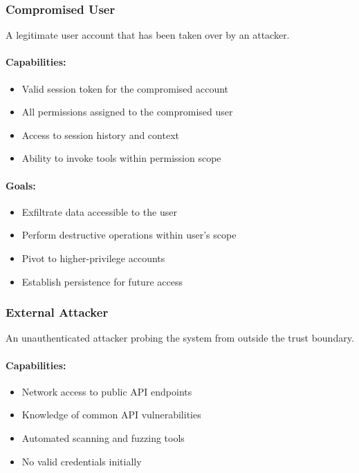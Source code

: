\subsubsection{Compromised User}

A legitimate user account that has been taken over by an attacker.

\paragraph{Capabilities:}
\begin{itemize}
    \item Valid session token for the compromised account
    \item All permissions assigned to the compromised user
    \item Access to session history and context
    \item Ability to invoke tools within permission scope
\end{itemize}

\paragraph{Goals:}
\begin{itemize}
    \item Exfiltrate data accessible to the user
    \item Perform destructive operations within user's scope
    \item Pivot to higher-privilege accounts
    \item Establish persistence for future access
\end{itemize}

\subsubsection{External Attacker}

An unauthenticated attacker probing the system from outside the trust boundary.

\paragraph{Capabilities:}
\begin{itemize}
    \item Network access to public API endpoints
    \item Knowledge of common API vulnerabilities
    \item Automated scanning and fuzzing tools
    \item No valid credentials initially
\end{itemize}

